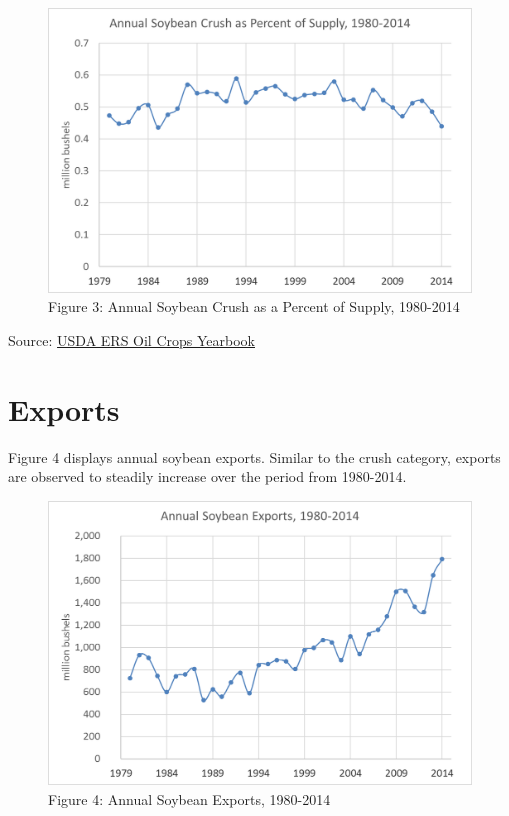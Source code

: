\documentclass[
  letterpaper,
  DIV=11,
  numbers=noendperiod]{scrreprt}
\begin{document}
\begin{figure}

{\centering \includegraphics{Excel-files/ForecastingUseSoy-OilCropsYearbook_files/image007.png}

}

\caption{Figure 3: Annual Soybean Crush as a Percent of Supply,
1980-2014}

\end{figure}

Source:
\href{http://www.ers.usda.gov/data-products/oil-crops-yearbook.aspx}{USDA
ERS Oil Crops Yearbook}

\hypertarget{exports-2}{%
\section{Exports}\label{exports-2}}

Figure 4 displays annual soybean exports. Similar to the crush category,
exports are observed to steadily increase over the period from
1980-2014.

\begin{figure}

{\centering \includegraphics{Excel-files/ForecastingUseSoy-OilCropsYearbook_files/image001.png}

}

\caption{Figure 4: Annual Soybean Exports, 1980-2014}

\end{figure}
\end{document}
